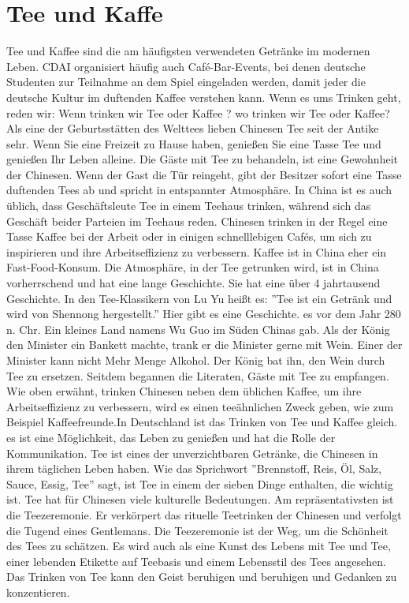 \section{Tee und Kaffe}
Tee und Kaffee sind die am häufigsten verwendeten Getränke im modernen Leben. CDAI organisiert häufig auch Café-Bar-Events, bei denen deutsche Studenten zur Teilnahme an dem Spiel eingeladen werden, damit jeder die deutsche Kultur im duftenden Kaffee verstehen kann.
\mypar
Wenn es ums Trinken geht, reden wir: Wenn trinken wir Tee oder Kaffee ? wo trinken wir Tee  oder Kaffee? Als eine der Geburtsstätten des Welttees lieben Chinesen Tee seit der Antike sehr. Wenn Sie eine Freizeit zu Hause haben, genie\ss en Sie eine Tasse Tee und genie\ss en Ihr Leben alleine. Die Gäste mit Tee zu behandeln, ist eine Gewohnheit der Chinesen. Wenn der Gast die Tür reingeht, gibt der Besitzer sofort eine Tasse duftenden Tees ab und spricht in entspannter Atmosphäre. In China ist es auch üblich, dass Geschäftsleute Tee in einem Teehaus trinken, während sich das Geschäft beider Parteien im Teehaus reden.
\mypar
Chinesen trinken in der Regel eine Tasse Kaffee bei der Arbeit oder in einigen schnelllebigen Cafés, um sich zu inspirieren und ihre Arbeitseffizienz zu verbessern. Kaffee ist in China eher ein Fast-Food-Konsum. Die Atmosphäre, in der Tee getrunken wird, ist in China vorherrschend und hat eine lange Geschichte. Sie hat eine  über 4 jahrtausend Geschichte. In den Tee-Klassikern von Lu Yu hei\ss t es: ''Tee ist ein Getränk und wird von Shennong hergestellt.''
Hier gibt es eine Geschichte. es vor dem Jahr 280 n. Chr. Ein kleines Land namens Wu Guo im Süden Chinas gab. Als der König den Minister ein Bankett machte, trank er die Minister gerne mit Wein. Einer der Minister kann nicht Mehr Menge Alkohol. Der König bat ihn, den Wein durch Tee zu ersetzen. Seitdem begannen die Literaten, Gäste mit Tee zu empfangen. Wie oben erwähnt, trinken Chinesen neben dem üblichen Kaffee, um ihre Arbeitseffizienz zu verbessern, wird es einen teeähnlichen Zweck geben, wie zum Beispiel Kaffeefreunde.In Deutschland ist das Trinken von Tee und Kaffee gleich. es ist eine Möglichkeit, das Leben zu genie\ss en und hat die Rolle der Kommunikation.
\mypar
Tee ist eines der unverzichtbaren Getränke, die Chinesen in ihrem täglichen Leben haben. Wie das Sprichwort ''Brennstoff, Reis, Öl, Salz, Sauce, Essig, Tee'' sagt, ist Tee in einem der sieben Dinge enthalten, die wichtig ist. Tee hat für Chinesen viele kulturelle Bedeutungen. Am repräsentativsten ist die Teezeremonie. Er verkörpert das rituelle Teetrinken der Chinesen und verfolgt die Tugend eines Gentlemans. Die Teezeremonie ist der Weg, um die Schönheit des Tees zu schätzen. Es wird auch als eine Kunst des Lebens mit Tee und Tee, einer lebenden Etikette auf Teebasis und einem Lebensstil des Tees angesehen.  Das Trinken von Tee kann den Geist beruhigen und beruhigen und Gedanken zu konzentieren.
